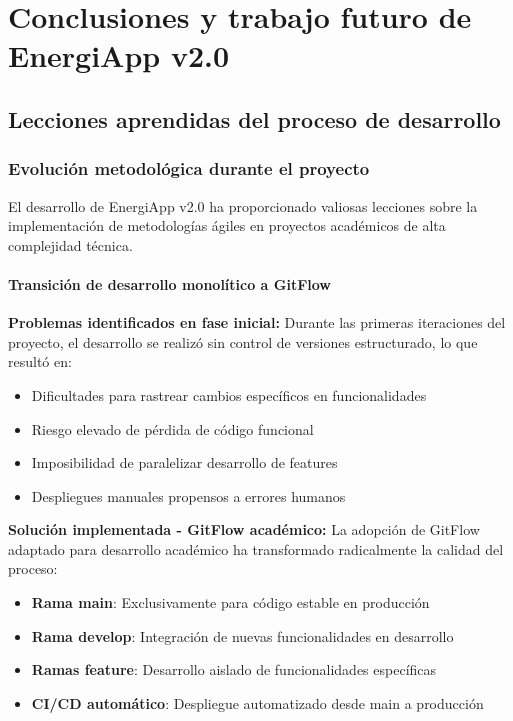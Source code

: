 \chapter{Conclusiones y trabajo futuro de EnergiApp v2.0}
\label{ch:conclusiones}

\section{Lecciones aprendidas del proceso de desarrollo}

\subsection{Evolución metodológica durante el proyecto}

El desarrollo de EnergiApp v2.0 ha proporcionado valiosas lecciones sobre la implementación de metodologías ágiles en proyectos académicos de alta complejidad técnica.

\subsubsection{Transición de desarrollo monolítico a GitFlow}

\textbf{Problemas identificados en fase inicial:}
Durante las primeras iteraciones del proyecto, el desarrollo se realizó sin control de versiones estructurado, lo que resultó en:
\begin{itemize}
    \item Dificultades para rastrear cambios específicos en funcionalidades
    \item Riesgo elevado de pérdida de código funcional
    \item Imposibilidad de paralelizar desarrollo de features
    \item Despliegues manuales propensos a errores humanos
\end{itemize}

\textbf{Solución implementada - GitFlow académico:}
La adopción de GitFlow adaptado para desarrollo académico ha transformado radicalmente la calidad del proceso:
\begin{itemize}
    \item \textbf{Rama main}: Exclusivamente para código estable en producción
    \item \textbf{Rama develop}: Integración de nuevas funcionalidades en desarrollo
    \item \textbf{Ramas feature}: Desarrollo aislado de funcionalidades específicas
    \item \textbf{CI/CD automático}: Despliegue automatizado desde main a producción
\end{itemize}

